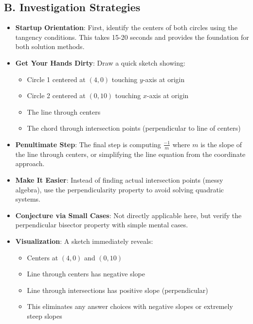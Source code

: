 \documentclass[12pt]{article}
\begin{document}
\begin{strategicbox}
\subsection*{B. Investigation Strategies}
\begin{itemize}[leftmargin=*]
    \item \textbf{Startup Orientation}: First, identify the centers of both circles using the tangency conditions. This takes 15-20 seconds and provides the foundation for both solution methods.
    \item \textbf{Get Your Hands Dirty}: Draw a quick sketch showing:
    \begin{itemize}
        \item Circle 1 centered at $(4,0)$ touching $y$-axis at origin
        \item Circle 2 centered at $(0,10)$ touching $x$-axis at origin  
        \item The line through centers
        \item The chord through intersection points (perpendicular to line of centers)
    \end{itemize}
    \item \textbf{Penultimate Step}: The final step is computing $\frac{-1}{m}$ where $m$ is the slope of the line through centers, or simplifying the line equation from the coordinate approach.
    \item \textbf{Make It Easier}: Instead of finding actual intersection points (messy algebra), use the perpendicularity property to avoid solving quadratic systems.
    \item \textbf{Conjecture via Small Cases}: Not directly applicable here, but verify the perpendicular bisector property with simple mental cases.
    \item \textbf{Visualization}: A sketch immediately reveals:
    \begin{itemize}
        \item Centers at $(4,0)$ and $(0,10)$
        \item Line through centers has negative slope
        \item Line through intersections has positive slope (perpendicular)
        \item This eliminates any answer choices with negative slopes or extremely steep slopes
    \end{itemize}
\end{itemize}


\end{strategicbox}
\end{document}
